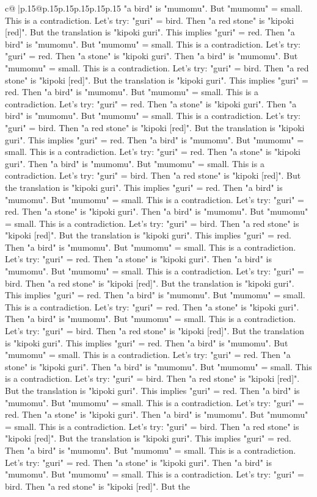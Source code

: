 \documentclass{article}
\begin{document}
{\begin{supertabular}{c@{$\;$}|p{.15\linewidth}@{}p{.15\linewidth}p{.15\linewidth}p{.15\linewidth}p{.15\linewidth}p{.15\linewidth}}
{{{"a bird" is "mumomu". But "mumomu" = small. This is a contradiction. Let's try: "guri" = bird. Then "a red stone" is "kipoki {[}red{]}". But the translation is "kipoki guri". This implies "guri" = red. Then "a bird" is "mumomu". But "mumomu" = small. This is a contradiction. Let's try: "guri" = red. Then "a stone" is "kipoki guri". Then "a bird" is "mumomu". But "mumomu" = small. This is a contradiction. Let's try: "guri" = bird. Then "a red stone" is "kipoki {[}red{]}". But the translation is "kipoki guri". This implies "guri" = red. Then "a bird" is "mumomu". But "mumomu" = small. This is a contradiction. Let's try: "guri" = red. Then "a stone" is "kipoki guri". Then "a bird" is "mumomu". But "mumomu" = small. This is a contradiction. Let's try: "guri" = bird. Then "a red stone" is "kipoki {[}red{]}". But the translation is "kipoki guri". This implies "guri" = red. Then "a bird" is "mumomu". But "mumomu" = small. This is a contradiction. Let's try: "guri" = red. Then "a stone" is "kipoki guri". Then "a bird" is "mumomu". But "mumomu" = small. This is a contradiction. Let's try: "guri" = bird. Then "a red stone" is "kipoki {[}red{]}". But the translation is "kipoki guri". This implies "guri" = red. Then "a bird" is "mumomu". But "mumomu" = small. This is a contradiction. Let's try: "guri" = red. Then "a stone" is "kipoki guri". Then "a bird" is "mumomu". But "mumomu" = small. This is a contradiction. Let's try: "guri" = bird. Then "a red stone" is "kipoki {[}red{]}". But the translation is "kipoki guri". This implies "guri" = red. Then "a bird" is "mumomu". But "mumomu" = small. This is a contradiction. Let's try: "guri" = red. Then "a stone" is "kipoki guri". Then "a bird" is "mumomu". But "mumomu" = small. This is a contradiction. Let's try: "guri" = bird. Then "a red stone" is "kipoki {[}red{]}". But the translation is "kipoki guri". This implies "guri" = red. Then "a bird" is "mumomu". But "mumomu" = small. This is a contradiction. Let's try: "guri" = red. Then "a stone" is "kipoki guri". Then "a bird" is "mumomu". But "mumomu" = small. This is a contradiction. Let's try: "guri" = bird. Then "a red stone" is "kipoki {[}red{]}". But the translation is "kipoki guri". This implies "guri" = red. Then "a bird" is "mumomu". But "mumomu" = small. This is a contradiction. Let's try: "guri" = red. Then "a stone" is "kipoki guri". Then "a bird" is "mumomu". But "mumomu" = small. This is a contradiction. Let's try: "guri" = bird. Then "a red stone" is "kipoki {[}red{]}". But the translation is "kipoki guri". This implies "guri" = red. Then "a bird" is "mumomu". But "mumomu" = small. This is a contradiction. Let's try: "guri" = red. Then "a stone" is "kipoki guri". Then "a bird" is "mumomu". But "mumomu" = small. This is a contradiction. Let's try: "guri" = bird. Then "a red stone" is "kipoki {[}red{]}". But the translation is "kipoki guri". This implies "guri" = red. Then "a bird" is "mumomu". But "mumomu" = small. This is a contradiction. Let's try: "guri" = red. Then "a stone" is "kipoki guri". Then "a bird" is "mumomu". But "mumomu" = small. This is a contradiction. Let's try: "guri" = bird. Then "a red stone" is "kipoki {[}red{]}". But the }}}
\end{supertabular}}
\end{document}
